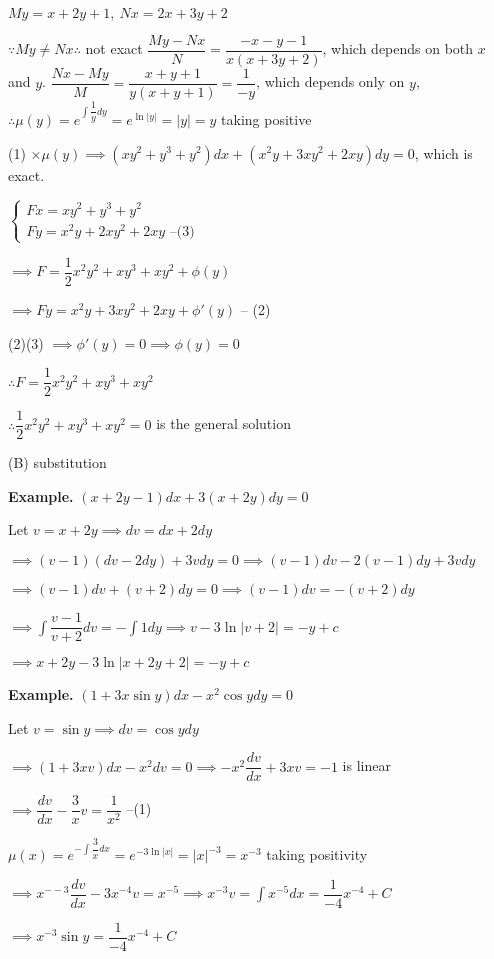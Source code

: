 \begin{solution}
	$My = x + 2y + 1,~Nx = 2x + 3y + 2$
	
	$\because My \neq Nx \therefore$ not exact $\dfrac{My - Nx}{N} = \dfrac{-x-y-1}{x(x+3y+2)}$, which depends on both $x$ and $y$. $\dfrac{Nx - My}{M} = \dfrac{x + y + 1}{y(x+y+1)} = \dfrac{1}{-y}$, which depends only on $y$, $\therefore \mu(y) = e^{\int \dfrac{1}{y}dy} = e^{\ln|y|} = |y| = y$ taking positive
	
	(1) $\times \mu(y) \implies (xy^2 + y^3 + y^2)dx + (x^2y+3xy^2 + 2xy)dy = 0$, which is exact.
	
	$\begin{cases}
		Fx = xy^2 + y^3 + y^2 \\
		Fy = x^2y + 2xy^2 + 2xy \text{ --(3)}
	\end{cases}$
	
	$\implies F = \dfrac{1}{2}x^2y^2 + xy^3 + xy^2 + \phi(y) $
	
	$\implies Fy = x^2y + 3xy^2 + 2xy + \phi'(y)$ -- (2)
	
	(2)(3) $\implies \phi'(y) = 0 \implies \phi(y) = 0$
	
	$\therefore F = \dfrac{1}{2}x^2y^2 + xy^3 + xy^2$
	
	$\therefore \dfrac{1}{2}x^2y^2 + xy^3 + xy^2 = 0$ is the general solution
\end{solution}

(B) substitution

\textbf{Example.} $(x + 2y - 1)dx + 3(x + 2y)dy = 0$

\begin{solution}
	Let $v = x + 2y \implies dv = dx + 2dy$
	
	$\implies (v - 1)(dv - 2dy) + 3vdy = 0 \implies (v-1)dv - 2(v-1)dy + 3vdy$
	
	$\implies (v-1)dv + (v+2)dy = 0 \implies (v-1)dv = -(v+2)dy$
	
	$\implies \int \dfrac{v - 1}{v+2}dv = - \int 1 dy \implies v - 3\ln |v+2| = -y + c$
	
	$\implies x+2y - 3\ln |x+2y+2| = -y+c$
\end{solution}

\textbf{Example.} $(1 + 3x \sin y)dx - x^2 \cos y dy = 0$

\begin{solution}
	Let $v = \sin y \implies dv = \cos y dy $
	
	$\implies (1 + 3xv)dx - x^2dv = 0 \implies -x^2 \dfrac{dv}{dx} + 3xv = -1$ is linear
	
	$\implies \dfrac{dv}{dx} - \dfrac{3}{x}v = \dfrac{1}{x^2}$ --(1)
	
	$\mu (x) = e^{-\int \dfrac{3}{x}dx} = e^{-3\ln|x|} = |x|^{-3} = x^{-3}$ taking positivity
	
	$\implies x^{--3}\dfrac{dv}{dx} - 3x^{-4}v = x^{-5} \implies x^{-3}v = \int x^{-5}dx = \dfrac{1}{-4}x^{-4} + C$
	
	$\implies x^{-3}\sin y = \dfrac{1}{-4}x^{-4} + C$
\end{solution}

